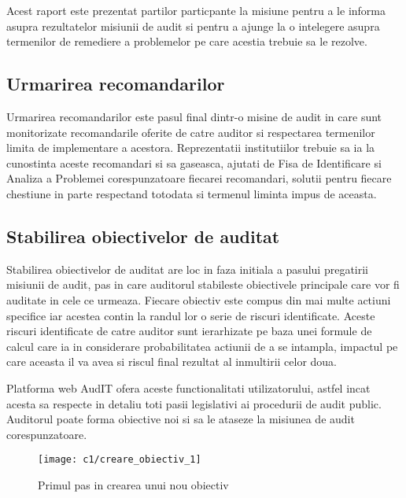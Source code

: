 Acest raport este prezentat partilor particpante la misiune pentru a le informa asupra rezultatelor misiunii de audit si pentru a ajunge la o intelegere asupra termenilor de remediere a problemelor pe care acestia trebuie sa le rezolve.

\subsection*{Urmarirea recomandarilor}
Urmarirea recomandarilor este pasul final dintr-o misine de audit in care sunt monitorizate recomandarile oferite de catre auditor si respectarea termenilor limita de implementare a acestora. Reprezentatii institutiilor trebuie sa ia la cunostinta aceste recomandari si sa gaseasca, ajutati de Fisa de Identificare si Analiza a Problemei corespunzatoare fiecarei recomandari, solutii pentru fiecare chestiune in parte respectand totodata si termenul liminta impus de aceasta.


\subsection{Stabilirea obiectivelor de auditat}

Stabilirea obiectivelor de auditat are loc in faza initiala a pasului pregatirii misiunii de audit, pas in care auditorul stabileste obiectivele principale care vor fi auditate in cele ce urmeaza. Fiecare obiectiv este compus din mai multe actiuni specifice iar acestea contin la randul lor o serie de riscuri identificate. Aceste riscuri identificate de catre auditor sunt ierarhizate pe baza unei formule de calcul care ia in considerare probabilitatea actiunii de a se intampla, impactul pe care aceasta il va avea si riscul final rezultat al inmultirii celor doua.

Platforma web AudIT ofera aceste functionalitati utilizatorului, astfel incat acesta sa respecte in detaliu toti pasii legislativi ai procedurii de audit public. Auditorul poate forma obiective noi si sa le ataseze la misiunea de audit corespunzatoare.\\

\begin{figure}[h]
	\centering
	
	\texttt{[image: c1/creare\_obiectiv\_1]}
	\caption{Primul pas in crearea unui nou obiectiv	}
\end{figure}

